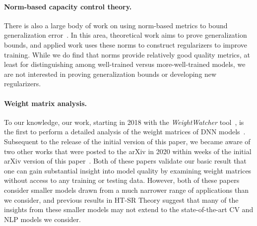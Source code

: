 \paragraph{Norm-based capacity control theory.}

There is also a large body of work on using norm-based metrics to bound generalization error~\cite{NTS15, BFT17_TR, LMBx18_TR}.
In this area, theoretical work aims to prove generalization bounds, and applied work uses these norms to construct regularizers to improve training.
While we do find that norms provide relatively good quality metrics, at least for distinguishing among well-trained versus more-well-trained models, we are not interested in proving generalization bounds or developing new regularizers.

\paragraph{Weight matrix analysis.}
To our knowledge, our work, starting in 2018 with the \emph{WeightWatcher} tool~\cite{weightwatcher_package}, is the first to perform a detailed analysis of the weight matrices of DNN models~\cite{MM18_TR, MM19_HTSR_ICML, MM20_SDM}.
Subsequent to the release of the initial version of this paper, we became aware of two other works that were posted to the arXiv in 2020 within weeks of the initial arXiv version of this paper~\cite{EJRUY20_TR,UKGBT20_TR}.
Both of these papers validate our basic result that one can gain substantial insight into model quality by examining weight matrices without access to any training or testing data.
However, both of these papers consider smaller models drawn from a much narrower range of applications than we consider, and previous results in HT-SR Theory suggest that many of the insights from these smaller models may not extend to the state-of-the-art CV and NLP models we consider.



